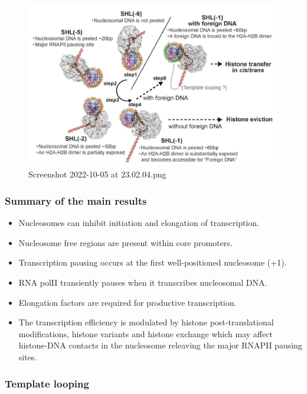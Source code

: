 \begin{figure}
\centering
\includegraphics[width=\textwidth]{../_resources/Screenshot_2022-10-05_at_23-02-04.png}
\caption{Screenshot 2022-10-05 at 23.02.04.png}
\end{figure}

\hypertarget{summary-of-the-main-results}{%
\subsubsection{Summary of the main results}\label{summary-of-the-main-results}}

\begin{itemize}
\tightlist
\item
  Nucleosomes can inhibit initiation and elongation of transcription.
\item
  Nucleosome free regions are present within core promoters.
\item
  Transcription pausing occurs at the first well-positioned nucleosome (+1).
\item
  RNA polII transiently pauses when it transcribes nucleosomal DNA.
\item
  Elongation factors are required for productive transcription.
\item
  The transcription efficiency is modulated by histone post-translational modifications, histone variants and histone exchange which may affect histone-DNA contacts in the nucleosome releaving the major RNAPII pausing sites.
\end{itemize}

\hypertarget{template-looping}{%
\subsubsection{Template looping}\label{template-looping}}

